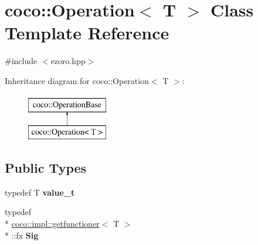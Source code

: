 \hypertarget{classcoco_1_1_operation}{\section{coco\-:\-:Operation$<$ T $>$ Class Template Reference}
\label{classcoco_1_1_operation}
}


{\ttfamily \#include $<$ezoro.\-hpp$>$}

Inheritance diagram for coco\-:\-:Operation$<$ T $>$\-:\begin{figure}[H]
\begin{center}
\leavevmode
\includegraphics[height=2.000000cm]{classcoco_1_1_operation}
\end{center}
\end{figure}
\subsection*{Public Types}
\begin{DoxyCompactItemize}
\item 
\hypertarget{classcoco_1_1_operation_aa8aaeac21ceaea024a719301af925df0}{typedef T {\bfseries value\-\_\-t}}\label{classcoco_1_1_operation_aa8aaeac21ceaea024a719301af925df0}

\item 
\hypertarget{classcoco_1_1_operation_a5d535eef83aa091a4b2e36cf7114f677}{typedef \\*
\hyperlink{structcoco_1_1impl_1_1getfunctioner}{coco\-::impl\-::getfunctioner}$<$ T $>$\\*
\-::fx {\bfseries Sig}}\label{classcoco_1_1_operation_a5d535eef83aa091a4b2e36cf7114f677}

\end{DoxyCompactItemize}
